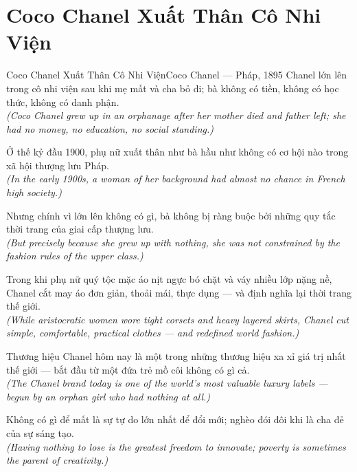 \section{Coco Chanel Xuất Thân Cô Nhi Viện}
\begin{truyen}{Coco Chanel Xuất Thân Cô Nhi Viện}{Coco Chanel --- Pháp, 1895}
 Chanel lớn lên trong cô nhi viện sau khi mẹ mất và cha bỏ đi; bà không có tiền, không có học thức, không có danh phận.\\[4pt]
\textit{(Coco Chanel grew up in an orphanage after her mother died and father left; she had no money, no education, no social standing.)}

Ở thế kỷ đầu 1900, phụ nữ xuất thân như bà hầu như không có cơ hội nào trong xã hội thượng lưu Pháp.\\[4pt]
\textit{(In the early 1900s, a woman of her background had almost no chance in French high society.)}

Nhưng chính vì lớn lên không có gì, bà không bị ràng buộc bởi những quy tắc thời trang của giai cấp thượng lưu.\\[4pt]
\textit{(But precisely because she grew up with nothing, she was not constrained by the fashion rules of the upper class.)}

Trong khi phụ nữ quý tộc mặc áo nịt ngực bó chặt và váy nhiều lớp nặng nề, Chanel cắt may áo đơn giản, thoải mái, thực dụng --- và định nghĩa lại thời trang thế giới.\\[4pt]
\textit{(While aristocratic women wore tight corsets and heavy layered skirts, Chanel cut simple, comfortable, practical clothes --- and redefined world fashion.)}

Thương hiệu Chanel hôm nay là một trong những thương hiệu xa xỉ giá trị nhất thế giới --- bắt đầu từ một đứa trẻ mồ côi không có gì cả.\\[4pt]
\textit{(The Chanel brand today is one of the world's most valuable luxury labels --- begun by an orphan girl who had nothing at all.)}

\end{truyen}
\begin{baihoc}
  Không có gì để mất là sự tự do lớn nhất để đổi mới; nghèo đói đôi khi là cha đẻ của sự sáng tạo.\\[4pt]
  \textit{(Having nothing to lose is the greatest freedom to innovate; poverty is sometimes the parent of creativity.)}
\end{baihoc}

